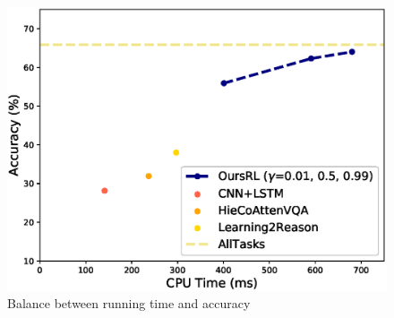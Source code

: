\begin{figure}[h]
	\begin{center}
		\includegraphics[width=0.75\linewidth]{figures/TimevsAcc.eps}
	\end{center}
	\vspace{-3ex}
	\caption{Balance between running time and accuracy}
	\vspace{-2ex}
	\label{fig:TimevsAcc}
\end{figure}


